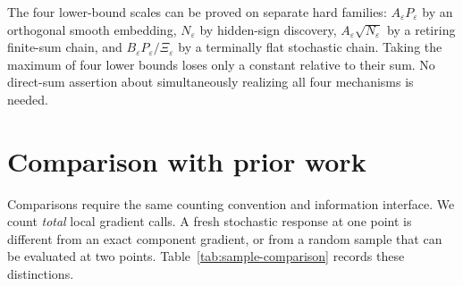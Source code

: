 \documentclass[11pt,a4paper]{article}
\newcommand{\eps}{\varepsilon}
\theoremstyle{remark}
\begin{document}
The four lower-bound scales can be proved on separate hard families:
$A_\eps P_\eps$ by an orthogonal smooth embedding,
$N_\eps$ by hidden-sign discovery,
$A_\eps\sqrt{N_\eps}$ by a retiring finite-sum chain, and
$B_\eps P_\eps/\Xi_\eps$ by a terminally flat stochastic chain.
Taking the maximum of four lower bounds loses only a constant relative to
their sum. No direct-sum assertion about simultaneously realizing all four
mechanisms is needed.

\section{Comparison with prior work}
\label{sec:related}

Comparisons require the same counting convention and information interface.
We count \emph{total} local gradient calls. A fresh stochastic response at
one point is different from an exact component gradient, or from a random
sample that can be evaluated at two points. Table~\ref{tab:sample-comparison}
records these distinctions.
\end{document}
